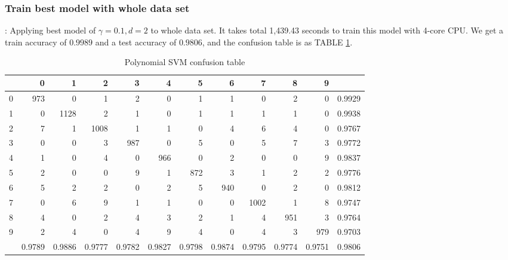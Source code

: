 \documentclass[8pt]{beamer}
\begin{document}
\subsubsection{Train best model with whole data set}
\begin{frame}[allowframebreaks]{\secname : \subsecname}{\subsubsecname}
Applying best model of $\gamma=0.1,d=2$ to whole data set. It takes total 1,439.43 seconds to train this model with 4-core CPU. We get a train accuracy of $0.9989$ and a test accuracy of $0.9806$, and the confusion table is as TABLE \ref{tab:Polynomial SVM confusion table}.
\begin{table}[htbp]
\tiny
  \centering
  \caption{Polynomial SVM confusion table}
\begin{tabular}{|r|rrrrrrrrrr|r|}
\hline
  & 0 & 1 & 2 & 3 & 4 & 5 & 6 & 7 & 8 & 9 &  \\
\hline
0 & 973 & 0 & 1 & 2 & 0 & 1 & 1 & 0 & 2 & 0 & 0.9929 \\
1 & 0 & 1128 & 2 & 1 & 0 & 1 & 1 & 1 & 1 & 0 & 0.9938 \\
2 & 7 & 1 & 1008 & 1 & 1 & 0 & 4 & 6 & 4 & 0 & 0.9767 \\
3 & 0 & 0 & 3 & 987 & 0 & 5 & 0 & 5 & 7 & 3 & 0.9772 \\
4 & 1 & 0 & 4 & 0 & 966 & 0 & 2 & 0 & 0 & 9 & 0.9837 \\
5 & 2 & 0 & 0 & 9 & 1 & 872 & 3 & 1 & 2 & 2 & 0.9776 \\
6 & 5 & 2 & 2 & 0 & 2 & 5 & 940 & 0 & 2 & 0 & 0.9812 \\
7 & 0 & 6 & 9 & 1 & 1 & 0 & 0 & 1002 & 1 & 8 & 0.9747 \\
8 & 4 & 0 & 2 & 4 & 3 & 2 & 1 & 4 & 951 & 3 & 0.9764 \\
9 & 2 & 4 & 0 & 4 & 9 & 4 & 0 & 4 & 3 & 979 & 0.9703 \\
\hline
  & 0.9789 & 0.9886 & 0.9777 & 0.9782 & 0.9827 & 0.9798 & 0.9874 & 0.9795 & 0.9774 & 0.9751 & 0.9806 \\
\hline
\end{tabular}%
  \label{tab:Polynomial SVM confusion table}%
\end{table}%
\end{frame}
\end{document}
